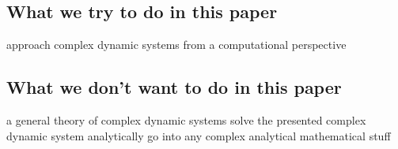 \subsection{What we try to do in this paper}
approach complex dynamic systems from a computational perspective

\subsection{What we don't want to do in this paper}
a general theory of complex dynamic systems
solve the presented complex dynamic system analytically
go into any complex analytical mathematical stuff

